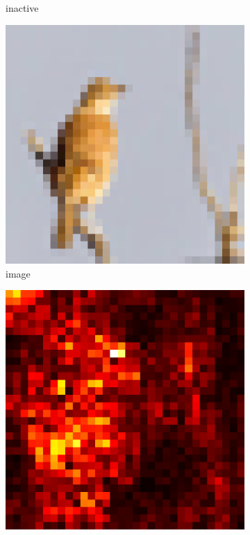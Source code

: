 \documentclass[preprint,12pt]{elsarticle}
\begin{document}
\begin{figure}
\begin{subfigure}{0.14\textwidth}
        \caption{inactive}
    \end{subfigure}
    \hfill
    \begin{subfigure}{0.14\linewidth}
        \centering
        \includegraphics[width=\linewidth]{../visualizations/examples/cifar10/cnn/images/2.png}
        \caption{image}
    \end{subfigure}
    \hfill
    \begin{subfigure}{0.14\linewidth}
        \centering
        \includegraphics[width=\linewidth]{../visualizations/examples/cifar10/cnn/saliency_map/2.png}

\end{subfigure}
\end{figure}
\end{document}
